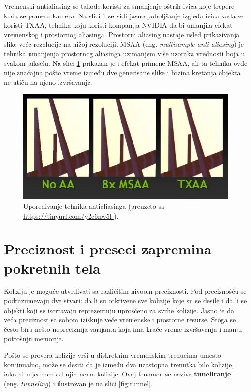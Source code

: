 \documentclass[12pt,oneside]{memoir}
\begin{document}
Vremenski antialiasing se takođe koristi za smanjenje oštrih ivica koje trepere kada se pomera kamera.
Na slici \ref{fig:txaa} se vidi jasno poboljšanje izgleda ivica kada se koristi TXAA,
tehnika koju koristi kompanija NVIDIA da bi umanjila efekat vremenskog i prostornog aliasinga.
Prostorni aliasing nastaje usled prikazivanja slike veće rezolucije na nižoj rezoluciji.
MSAA (eng. {\em multisample anti-aliasing}) je tehnika umanjenja prostornog aliasinga 
uzimanjem više uzoraka vrednosti boja u svakom pikselu.
Na slici \ref{fig:txaa} prikazan je i efekat primene MSAA, ali ta tehnika ovde nije značajna 
pošto vreme između dve generisane slike i brzina kretanja objekta ne utiču na njeno izvršavanje.

\begin{figure}[h!]
	\centering
	\includegraphics[scale=0.65]{txaa.png}
	\caption{Upoređivanje tehnika antialiasinga (\tiny preuzeto sa \url{ https://tinyurl.com/y2c6nw5l }).}
	
	\label{fig:txaa}
\end{figure}

\section{Preciznost i preseci zapremina pokretnih tela}

Koliziju je moguće utvrđivati sa različitim nivoom preciznosti. 
Pod preciznošću se podrazumevaju dve stvari: da li su otkrivene sve kolizije koje su se desile i 
da li se objekti koji se iscrtavaju reprezentuju uprošćeno za svrhe kolizije. 
Jasno je da veća preciznost sa sobom iziskuje veće vremenske i prostorne resurse. 
Stoga se često bira nešto nepreciznija varijanta koja ima kraće vreme izvršavanja i manju potrošnju memorije.

Pošto se provera kolizije vrši u diskretnim vremenskim trenucima umesto kontinualno, može se desiti da 
je između dva uzastopna trenutka bilo kolizije, iako ni u jednom od njih nema kolizije. 
Ovaj fenomen se naziva \textbf{tuneliranje} (eng. {\em tunneling}) i ilustrovan je na slici \ref{fig:tunnel}. 
\end{document}
